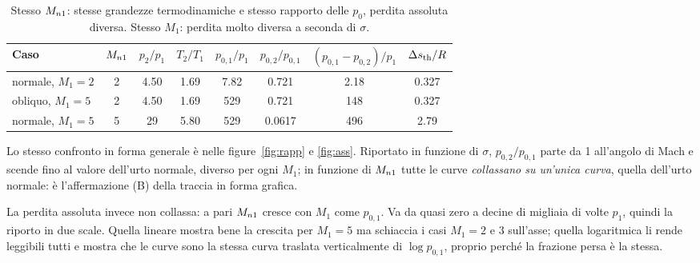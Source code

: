 \begin{table}[H]
  \centering\small
  \setlength{\tabcolsep}{4pt}
  \begin{tabular}{lccccccc}
    \toprule
    Caso & $M_{n1}$ & $p_2/p_1$ & $T_2/T_1$ & $p_{0,1}/p_1$ & $p_{0,2}/p_{0,1}$ & $(p_{0,1}-p_{0,2})/p_1$ &
    $\Delta s_{\rm th}/R$ \\
    \midrule
    normale, $M_1=2$  & 2 & \num{4.50} & \num{1.69} & \num{7.82} & \num{0.721} & \num{2.18} & \num{0.327} \\
    obliquo, $M_1=5$  & 2 & \num{4.50} & \num{1.69} & 529 & \num{0.721} & 148 & \num{0.327} \\
    normale, $M_1=5$  & 5 & 29 & \num{5.80} & 529 & \num{0.0617} & 496 & \num{2.79} \\
    \bottomrule
  \end{tabular}
  \caption{Stesso $M_{n1}$: stesse grandezze termodinamiche e stesso rapporto delle $p_0$, perdita assoluta diversa.
  Stesso $M_1$: perdita molto diversa a seconda di $\sigma$.}
  \label{tab:conf}
\end{table}

Lo stesso confronto in forma generale è nelle figure~\ref{fig:rapp} e \ref{fig:ass}. Riportato in funzione di
$\sigma$, $p_{0,2}/p_{0,1}$ parte da 1 all'angolo di Mach e scende fino al valore dell'urto normale, diverso per
ogni $M_1$; in funzione di $M_{n1}$ tutte le curve \emph{collassano su un'unica curva}, quella dell'urto normale: è
l'affermazione (B) della traccia in forma grafica.


La perdita assoluta invece non collassa: a pari $M_{n1}$ cresce con $M_1$ come $p_{0,1}$. Va da quasi zero a decine
di migliaia di volte $p_1$, quindi la riporto in due scale. Quella lineare mostra bene la crescita per $M_1=5$ ma
schiaccia i casi $M_1=2$ e $3$ sull'asse; quella logaritmica li rende leggibili tutti e mostra che le curve sono la
stessa curva traslata verticalmente di $\log p_{0,1}$, proprio perché la frazione persa è la stessa.


